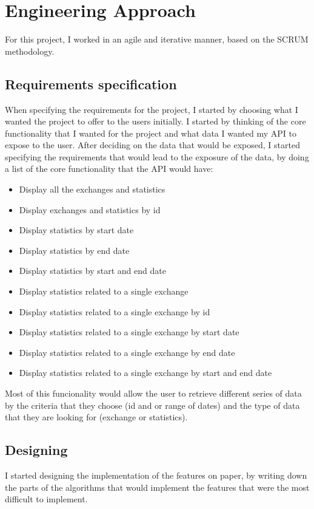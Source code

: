 \chapter{Engineering Approach}
For this project, I worked in an agile and iterative manner, based on the SCRUM methodology.

\section{Requirements specification}
When specifying the requirements for the project, I started by choosing what I wanted the project to offer to the users initially. I started by thinking of the core functionality that I wanted for the project and what data I wanted my API to expose to the user. After deciding on the data that would be exposed, I started specifying the requirements that would lead to the exposure of the data, by doing a list of the core functionality that the API would have:
\begin{itemize}
    \item Display all the exchanges and statistics
    \item Display exchanges and statistics by id
    \item Display statistics by start date
    \item Display statistics by end date
    \item Display statistics by start and end date
    \item Display statistics related to a single exchange
    \item Display statistics related to a single exchange by id
    \item Display statistics related to a single exchange by start date
    \item Display statistics related to a single exchange by end date
    \item Display statistics related to a single exchange by start and end date
\end{itemize}

Most of this funcionality would allow the user to retrieve different series of data by the criteria that they choose (id and or range of dates) and the type of data that they are looking for (exchange or statistics).

\section{Designing}
I started designing the implementation of the features on paper, by writing down the parts of the algorithms that would implement the features that were the most difficult to implement.

